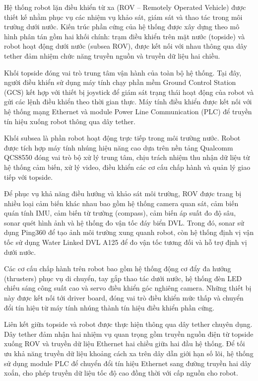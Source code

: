 \documentclass[../DoAn.tex]{subfiles}
\begin{document}
Hệ thống robot lặn điều khiển từ xa (ROV -- Remotely Operated Vehicle) được thiết kế nhằm phục vụ các nhiệm vụ khảo sát, giám sát và thao tác trong môi trường dưới nước. Kiến trúc phần cứng của hệ thống được xây dựng theo mô hình phân tán gồm hai khối chính: trạm điều khiển trên mặt nước (topside) và robot hoạt động dưới nước (subsea ROV), được kết nối với nhau thông qua dây tether đảm nhiệm chức năng truyền nguồn và truyền dữ liệu hai chiều.

Khối topside đóng vai trò trung tâm vận hành của toàn bộ hệ thống. Tại đây, người điều khiển sử dụng máy tính chạy phần mềm Ground Control Station (GCS) kết hợp với thiết bị joystick để giám sát trạng thái hoạt động của robot và gửi các lệnh điều khiển theo thời gian thực. Máy tính điều khiển được kết nối với hệ thống mạng Ethernet và module Power Line Communication (PLC) để truyền tín hiệu xuống robot thông qua dây tether.

Khối subsea là phần robot hoạt động trực tiếp trong môi trường nước. Robot được tích hợp máy tính nhúng hiệu năng cao dựa trên nền tảng 
Qualcomm QCS8550 
đóng vai trò bộ xử lý trung tâm, chịu trách nhiệm thu nhận dữ liệu từ hệ thống cảm biến, xử lý video, điều khiển các cơ cấu chấp hành và quản lý giao tiếp với topside.

Để phục vụ khả năng điều hướng và khảo sát môi trường, ROV được trang bị nhiều loại cảm biến khác nhau bao gồm hệ thống camera quan sát, cảm biến quán tính IMU, cảm biến từ trường (compass), cảm biến áp suất đo độ sâu, sonar quét hình ảnh và hệ thống đo vận tốc đáy biển DVL. Trong đó, sonar sử dụng 
Ping360 
để tạo ảnh môi trường xung quanh robot, còn hệ thống định vị vận tốc sử dụng 
Water Linked DVL A125 
để đo vận tốc tương đối và hỗ trợ định vị dưới nước.

Các cơ cấu chấp hành trên robot bao gồm hệ thống động cơ đẩy đa hướng (thrusters) phục vụ di chuyển, tay gắp thao tác dưới nước, hệ thống đèn LED chiếu sáng công suất cao và servo điều khiển góc nghiêng camera. Những thiết bị này được kết nối tới driver board, đóng vai trò điều khiển mức thấp và chuyển đổi tín hiệu từ máy tính nhúng thành tín hiệu điều khiển phần cứng.

Liên kết giữa topside và robot được thực hiện thông qua dây tether chuyên dụng. Dây tether đảm nhận hai nhiệm vụ quan trọng gồm truyền nguồn điện từ topside xuống ROV và truyền dữ liệu Ethernet hai chiều giữa hai đầu hệ thống. Để tối ưu khả năng truyền dữ liệu khoảng cách xa trên dây dẫn giới hạn số lõi, hệ thống sử dụng module PLC để chuyển đổi tín hiệu Ethernet sang đường truyền hai dây xoắn, cho phép truyền dữ liệu tốc độ cao đồng thời với cấp nguồn cho robot.
\end{document}
